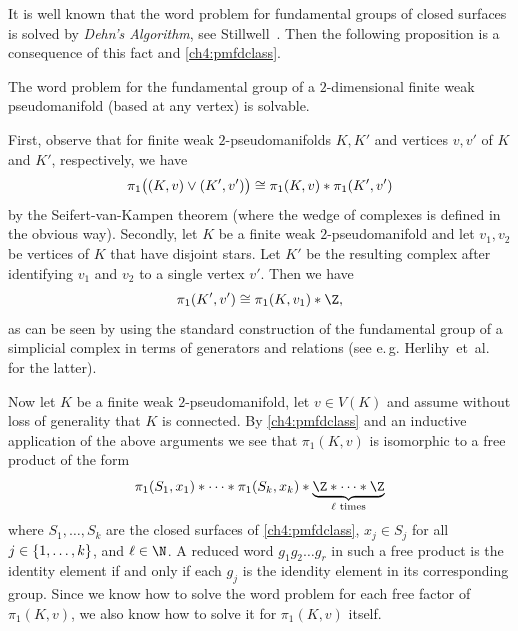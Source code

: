 It is well known that the word problem for fundamental groups of closed surfaces
is solved by \emph{Dehn's Algorithm}, see
Stillwell~\cite[Sec.~6.1]{bookc:stillwell93}.
Then the following proposition is a consequence of this fact and
\cref{ch4:pmfdclass}.

\begin{thProposition}
    \label{ch4:wordproblem}
    The word problem for the fundamental group of a $2$-dimensional finite weak
    pseudo\-manifold (based at any vertex) is solvable.
\end{thProposition}

\begin{proofsketch}
    First, observe that for finite weak $2$-pseudomanifolds $K,K'$ and vertices
    $v,v'$ of $K$ and $K'$, respectively, we have 
    \[  \pi_1\bigl( (K,v) \vee (K',v') \bigr)
            \cong \pi_1(K,v) \ast \pi_1(K',v')
    \]
    by the Seifert-van-Kampen theorem (where the wedge of complexes is defined
    in the obvious way). Secondly, let $K$ be a finite weak $2$-pseudomanifold
    and let $v_1,v_2$ be vertices of $K$ that have disjoint stars.
    Let $K'$ be the resulting complex after identifying $v_1$ and $v_2$ to a
    single vertex $v'$. Then we have
    \[ \pi_1(K',v') \cong \pi_1(K,v_1) \ast \Z , \]
    as can be seen by using the standard construction of the fundamental group
    of a simplicial complex in terms of generators and relations (see e.\,g.
    Herlihy~et~al.~\cite[Subsec.~15.1.2]{bookc:herlihyetal13}
    for the latter).

    Now let $K$ be a finite weak $2$-pseudomanifold, let $v\in V(K)$
    and assume without loss of generality that $K$ is connected.
    By \cref{ch4:pmfdclass} and an inductive application of the above arguments
    we see that $\pi_1(K,v)$ is isomorphic to a free product of the form
    \[ \pi_1(S_1,x_1) \ast \cdots \ast \pi_1(S_k,x_k)
        \ast \underbrace{\Z \ast \cdots \ast \Z}_{\ell\text{ times}}
    \]
    where $S_1,\dots,S_k$ are the closed surfaces of \cref{ch4:pmfdclass},
    $x_j\in S_j$ for all $j\in\{1,\ldots,k\}$, and $\ell\in\N$.
    A reduced word $g_1g_2\dots g_r$ in such a free product is the identity
    element if and only if each $g_j$ is the idendity element in its corresponding group.
    Since we know how to solve the word problem for each free factor
    of~$\pi_1(K,v)$, we also know how to solve it for $\pi_1(K,v)$ itself.
    \\
\end{proofsketch}

